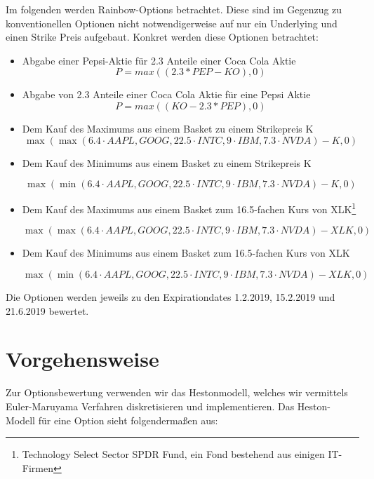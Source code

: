 \documentclass[12pt]{article}
\begin{document}
Im folgenden werden Rainbow-Options betrachtet. Diese sind im Gegenzug zu konventionellen Optionen nicht notwendigerweise auf nur ein Underlying und einen Strike Preis aufgebaut.
\newline
Konkret werden diese Optionen betrachtet:
\begin{itemize}
	\item Abgabe einer Pepsi-Aktie für 2.3 Anteile einer Coca Cola Aktie
		\begin{equation*}
	P=max((2.3*PEP-KO),0)
	\end{equation*}	
	\item Abgabe von 2.3 Anteile einer Coca Cola Aktie für eine Pepsi Aktie
	\begin{equation*}
	P=max((KO-2.3*PEP),0)
	\end{equation*}	
	\item Dem Kauf des Maximums aus einem Basket zu einem Strikepreis K
	\begin{equation*}
	\max(\max(6.4 \cdot AAPL,GOOG,22.5 \cdot INTC, 9 \cdot IBM, 7.3 \cdot NVDA)-K,0)
	\end{equation*}
	\item Dem Kauf des Minimums aus einem Basket zu einem Strikepreis K
	
	\begin{equation*}
	\max(\min(6.4 \cdot AAPL,GOOG,22.5 \cdot INTC, 9 \cdot IBM, 7.3 \cdot NVDA)-K,0)
	\end{equation*}
	\item Dem Kauf des Maximums aus einem Basket zum 16.5-fachen Kurs von XLK\footnote{Technology Select Sector SPDR Fund, ein Fond bestehend aus einigen IT-Firmen}
	
	\begin{equation*}
	\max(\max(6.4 \cdot AAPL,GOOG,22.5 \cdot INTC, 9 \cdot IBM, 7.3 \cdot NVDA)-XLK,0)
	\end{equation*}
	\item Dem Kauf des Minimums aus einem Basket zum 16.5-fachen Kurs von XLK
	
	\begin{equation*}
	\max(\min(6.4 \cdot AAPL,GOOG,22.5 \cdot INTC, 9 \cdot IBM, 7.3 \cdot NVDA)-XLK,0)
	\end{equation*}
	

\end{itemize}

Die Optionen werden jeweils zu den Expirationdates 1.2.2019, 15.2.2019 und 21.6.2019 bewertet.
\section*{Vorgehensweise}
Zur Optionsbewertung verwenden wir das Hestonmodell, welches wir vermittels Euler-Maruyama Verfahren diskretisieren und implementieren.
Das Heston-Modell für eine Option sieht folgendermaßen aus:
\end{document}
